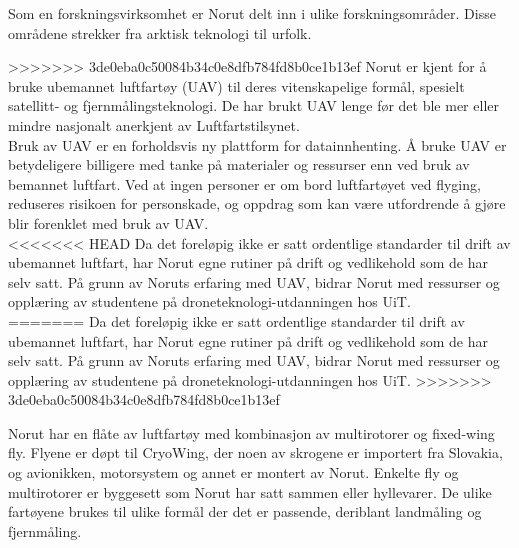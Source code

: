 \documentclass[12pt, a4paper]{article}
\begin{document}
Som en forskningsvirksomhet er Norut delt inn i ulike forskningsområder. Disse områdene strekker fra arktisk teknologi til urfolk.

>>>>>>> 3de0eba0c50084b34c0e8dfb784fd8b0ce1b13ef
Norut er kjent for å bruke ubemannet luftfartøy (UAV) til deres vitenskapelige formål, spesielt satellitt- og fjernmålingsteknologi.  De har brukt UAV lenge før det ble mer eller mindre nasjonalt anerkjent av Luftfartstilsynet.\\

Bruk av UAV er en forholdsvis ny plattform for datainnhenting. Å bruke UAV er betydeligere billigere med tanke på materialer og ressurser enn ved bruk av bemannet luftfart. Ved at ingen personer er om bord luftfartøyet ved flyging, reduseres risikoen for personskade, og oppdrag som kan være utfordrende å gjøre blir forenklet med bruk av UAV. \\

<<<<<<< HEAD
Da det foreløpig ikke er satt ordentlige standarder til drift av ubemannet luftfart, har Norut egne rutiner på drift og vedlikehold som de har selv satt. På grunn av Noruts erfaring med UAV, bidrar Norut med ressurser og opplæring av studentene på droneteknologi-utdanningen hos UiT. \\
=======
Da det foreløpig ikke er satt ordentlige standarder til drift av ubemannet luftfart, har Norut egne rutiner på drift og vedlikehold som de har selv satt. På grunn av Noruts erfaring med UAV, bidrar Norut med ressurser og opplæring av studentene på droneteknologi-utdanningen hos UiT. 
>>>>>>> 3de0eba0c50084b34c0e8dfb784fd8b0ce1b13ef

Norut har en flåte av luftfartøy med kombinasjon av multirotorer og fixed-wing fly. Flyene er døpt til CryoWing, der noen av skrogene er importert fra Slovakia, og avionikken, motorsystem og annet er montert av Norut. Enkelte fly og multirotorer er byggesett som Norut har satt sammen eller hyllevarer. De ulike fartøyene brukes til ulike formål der det er passende, deriblant landmåling og fjernmåling.\\
\newpage
\end{document}
